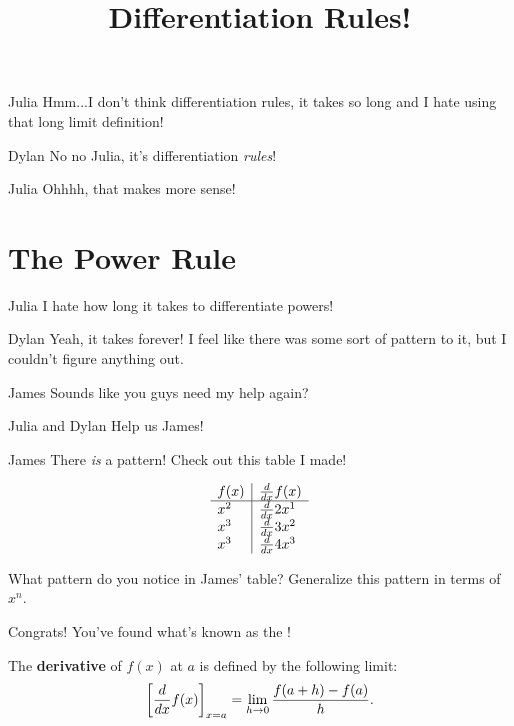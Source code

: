 \documentclass{ximera}
\title{Differentiation Rules!}
\begin{document}
\maketitle
\begin{dialogue}
\item[Julia] Hmm...I don't think differentiation rules, it takes so long and I hate using that long limit definition!
\item[Dylan] No no Julia, it's differentiation \textit{rules}!
\item[Julia] Ohhhh, that makes more sense!

\end{dialogue}
\section{The Power Rule}
\begin{dialogue}
\item[Julia] I hate how long it takes to differentiate powers!
\item[Dylan] Yeah, it takes forever! I feel like there was some sort of pattern to it, but I couldn't figure anything out.
\item[James] Sounds like you guys need my help again?
\item[Julia and Dylan] Help us James!
\item[James] There \textit{is} a pattern! Check out this table I made!
\end{dialogue}
\[
\begin{array}{l|l}
f(x) & \frac{d}{\mathop{}\!d x} f(x) \\
\hline
x^2 & \frac{d}{\mathop{}\!d x} 2x^1 \\
x^3 & \frac{d}{\mathop{}\!d x} 3x^2 \\
x^3 & \frac{d}{\mathop{}\!d x} 4x^3 
\end{array}
\]
\begin{question}
What pattern do you notice in James' table? Generalize this pattern in terms of $x^n$.
\begin{multipleChoice}
\end{multipleChoice}
\begin{feedback}[correct]
Congrats! You've found what's known as the !
\end{feedback}
\end{question}

\begin{definition}
  The \textbf{derivative} of $f(x)$ at $a$ is defined by the following limit:
  \[
  \bigg[ \frac{d}{dx} f(x) \bigg]_{x=a} = \lim_{h\to 0} \frac{f(a+h) - f(a)}{h}.
  \]
\end{definition}
\end{document}
